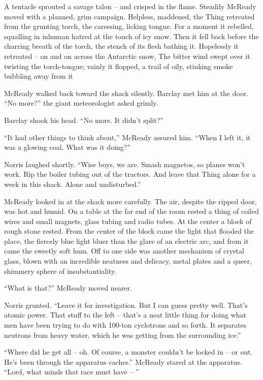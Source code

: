 \documentclass[letterpaper,openany,12pt]{memoir}		%
\begin{document}
A tentacle sprouted a savage talon -- and crisped in the flame. Steadily McReady
moved with a planned, grim campaign. Helpless, maddened, the Thing retreated
from the grunting torch, the caressing, licking tongue. For a moment it
rebelled, squalling in inhuman hatred at the touch of icy snow. Then it fell
back before the charring breath of the torch, the stench of its flesh bathing
it. Hopelessly it retreated -- on and on across the Antarctic snow, The bitter
wind swept over it twisting the torch-tongue; vainly it flopped, a trail of
oily, stinking smoke bubbling away from it

McReady walked back toward the shack silently. Barclay met him at the door. ``No
more?'' the giant meteorologist asked grimly.

Barclay shook his head. ``No more. It didn't split?''

``It had other things to think about,'' McReady assured him. ``When I left it,
it was a glowing coal. What was it doing?''

Norris laughed shortly. ``Wise boys, we are. Smash magnetos, so planes won't
work. Rip the boiler tubing out of the tractors. And leave that Thing alone for
a week in this shack. Alone and undisturbed.''

McReady looked in at the shack more carefully. The air, despite the ripped door,
was hot and humid. On a table at the far end of the room rested a thing of
coiled wires and small magnets, glass tubing and radio tubes. At the center a
block of rough stone rested. From the center of the block came the light that
flooded the place, the fiercely blue light bluer than the glare of an electric
arc, and from it came the sweetly soft hum. Off to one side was another
mechanism of crystal glass, blown with an incredible neatness and delicacy,
metal plates and a queer, shimmery sphere of insubstantiality.

``What is that?'' McReady moved nearer.

Norris grunted. ``Leave it for investigation. But I can guess pretty well.
That's atomic power. That stuff to the left -- that's a neat little thing for
doing what men have been trying to do with 100-ton cyclotrons and so forth. It
separates neutrons from heavy water, which he was getting from the surrounding
ice.''

``Where did he get all -- oh. Of course, a monster couldn't be locked in -- or
out. He's been through the apparatus caches.'' McReady stared at the apparatus.
``Lord, what minds that race must have -- ''
\end{document}
